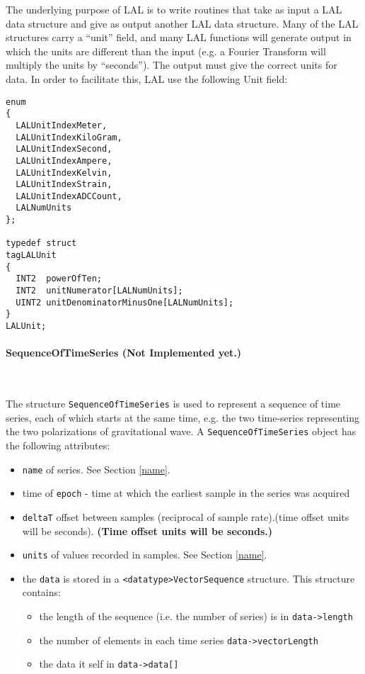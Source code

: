 \documentclass[]{ligodcc}
\renewcommand{\texttt}[1]{{\ttfamily\color{blue}#1}}
\begin{document}
The underlying purpose of LAL is to write routines that take as input
a LAL data structure and give as output another LAL data structure.
Many of the LAL structures carry a ``unit'' field, and many LAL
functions will generate output in which the  units are different than
the input (e.g. a Fourier Transform will multiply the units by
``seconds'').  The output must give the correct units for data.  In
order to facilitate this, LAL use the following Unit field:

{\footnotesize
\begin{verbatim}
enum
{
  LALUnitIndexMeter,
  LALUnitIndexKiloGram,
  LALUnitIndexSecond,
  LALUnitIndexAmpere,
  LALUnitIndexKelvin,
  LALUnitIndexStrain,
  LALUnitIndexADCCount,
  LALNumUnits
};

typedef struct
tagLALUnit
{
  INT2  powerOfTen;
  INT2  unitNumerator[LALNumUnits];
  UINT2 unitDenominatorMinusOne[LALNumUnits];
}
LALUnit;
\end{verbatim}}


\paragraph{{\texttt {SequenceOfTimeSeries}}  {\bf (Not Implemented yet.)} }~

The structure {\tt SequenceOfTimeSeries} is used to represent a sequence of
time series, each of which starts at the same time, e.g. the two
time-series representing the two polarizations of gravitational
wave. A  {\tt SequenceOfTimeSeries} object has the following attributes:

\begin{itemize}
\vspace{-0.15in}
\item
{\tt name} of series.  See Section \ref{name}.
\vspace{-0.15in}
\item
time of {\tt epoch} - time at which the earliest sample in the series was acquired
\vspace{-0.15in}
\item
{\tt deltaT} offset between samples (reciprocal of sample
rate).(time offset units will be seconds).  {\bf (Time offset units will
be seconds.)}
\vspace{-0.15in}
\item
{\tt units} of values recorded in samples. See Section \ref{name}.
\vspace{-0.15in}
\item
the {\tt data} is stored in a {\tt <datatype>VectorSequence}  structure.
This structure contains:
\begin{itemize}
\vspace{-0.10in}
\item
the length of the sequence (i.e. the number of series) is  in 
{\tt data->length}
\vspace{-0.10in}
\item
the number of elements in each time series {\tt data->vectorLength}
\vspace{-0.10in}
\item
the data it self in {\tt data->data[]}
\end{itemize}
\end{itemize}
\end{document}

